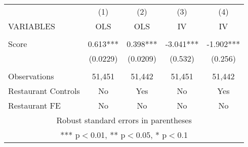 \begin{tabular}{lcccc} \hline
 & (1) & (2) & (3) & (4) \\
VARIABLES & OLS & OLS & IV & IV \\ \hline
 &  &  &  &  \\
Score & 0.613*** & 0.398*** & -3.041*** & -1.902*** \\
 & (0.0229) & (0.0209) & (0.532) & (0.256) \\
 &  &  &  &  \\
Observations & 51,451 & 51,442 & 51,451 & 51,442 \\
Restaurant Controls & No & Yes & No & Yes \\
 Restaurant FE & No & No & No & No \\ \hline
\multicolumn{5}{c}{ Robust standard errors in parentheses} \\
\multicolumn{5}{c}{ *** p$<$0.01, ** p$<$0.05, * p$<$0.1} \\
\end{tabular}
